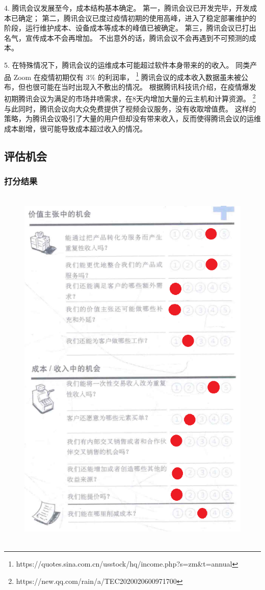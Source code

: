 \documentclass[a4paper,12pt]{article}
\begin{document}
    4.
    腾讯会议发展至今，成本结构基本确定。
    第一，腾讯会议已开发完毕，开发成本已确定；
    第二，腾讯会议已度过疫情初期的使用高峰，进入了稳定部署维护的阶段，运行维护成本、设备成本等成本的峰值已被确定。
    第三，腾讯会议已打出名气，宣传成本不会再增加。
    不出意外的话，腾讯会议不会再遇到不可预测的成本。


    5.
    在特殊情况下，腾讯会议的运维成本可能超过软件本身带来的的收入。
    同类产品 Zoom 在疫情初期仅有 3\% 的利润率，
    \footnote{https://quotes.sina.com.cn/usstock/hq/income.php?s=zm\&t=annual}
    腾讯会议的成本收入数据虽未被公布，但也很可能在当时出现入不敷出的情况。
    根据腾讯科技讯介绍，在疫情爆发初期腾讯会议为满足的市场井喷需求，在8天内增加大量的云主机和计算资源。
    \footnote{https://new.qq.com/rain/a/TEC2020020600971700}
    与此同时，腾讯会议向大众免费提供了视频会议服务，没有收取增值费。
    这样的策略，为腾讯会议吸引了大量的用户但却没有带来收入，反而使得腾讯会议的运维成本剧增，很可能导致成本超过收入的情况。



    \subsection{评估机会}\label{subsec:opportunity}
    \subsubsection{打分结果}
    \begin{figure}[htbp]
        \centering
        \includegraphics[width=12cm,height=18cm]{png/评估机会}
    \end{figure}
    \clearpage %
\end{document}
